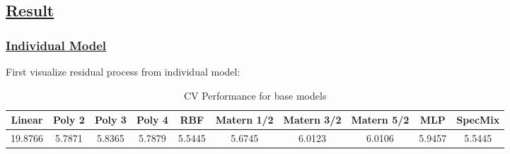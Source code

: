 \documentclass[11pt]{article}
\theoremstyle{definition}
\begin{document}
\newpage

\subsection{\underline{\textbf{Result}}}
\subsubsection{\underline{Individual Model}}

First visualize residual process from individual model:

\begin{table}[!htbp] 
\centering 
  \label{} 
\begin{tabular}{|c|c|c|c|c|c|c|c|c|c|} 
\hline \hline 
Linear & Poly 2 & Poly 3 & Poly 4 & RBF & Matern 1/2 & Matern 3/2 & Matern 5/2 & MLP & SpecMix
\\ \hline 
19.8766 & 5.7871 & 5.8365 & 5.7879 & 5.5445 & 5.6745 & 6.0123 & 6.0106 & 5.9457 & 5.5445
\\
\hline\hline
\end{tabular} 
\caption{CV Performance for base models} 
\label{tb:resid_joint}
\end{table} 
\end{document}
